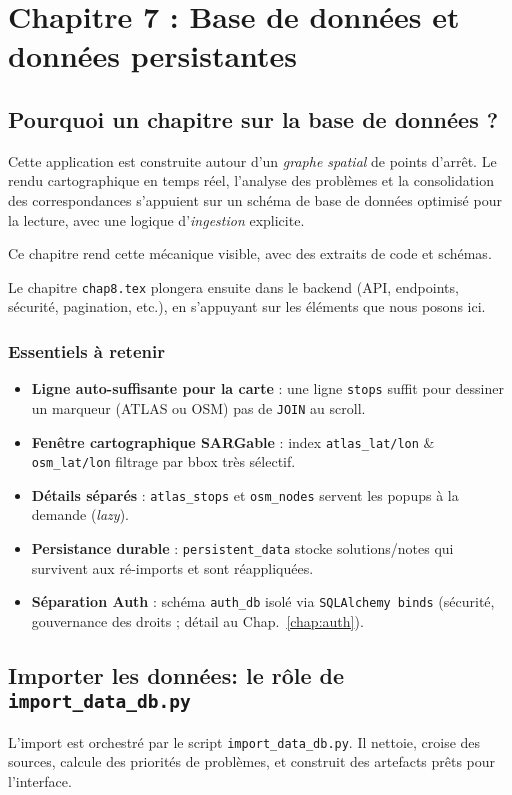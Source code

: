 \chapter{Chapitre 7 : Base de données et données persistantes}

\section*{Pourquoi un chapitre sur la base de données ?}

Cette application est construite autour d'un \textit{graphe spatial} de points d'arrêt. Le rendu cartographique en temps réel, l'analyse des problèmes et la consolidation des correspondances s'appuient sur un schéma de base de données optimisé pour la lecture, avec une logique d'\textit{ingestion} explicite. 

Ce chapitre rend cette mécanique visible, avec des extraits de code et schémas.

\vspace{0.5em}
Le chapitre \texttt{chap8.tex} plongera ensuite dans le backend (API, endpoints, sécurité, pagination, etc.), en s'appuyant sur les éléments que nous posons ici.

\subsection*{Essentiels à retenir}
\begin{itemize}
  \item \textbf{Ligne auto-suffisante pour la carte} : une ligne \texttt{stops} suffit pour dessiner un marqueur (ATLAS ou OSM) \Rightarrow pas de \texttt{JOIN} au scroll.
  \item \textbf{Fenêtre cartographique SARGable} : index \texttt{atlas\_lat/lon} \& \texttt{osm\_lat/lon} \Rightarrow filtrage par bbox très sélectif.
  \item \textbf{Détails séparés} : \texttt{atlas\_stops} et \texttt{osm\_nodes} servent les popups à la demande (\textit{lazy}).
  \item \textbf{Persistance durable} : \texttt{persistent\_data} stocke solutions/notes qui \og survivent \fg{} aux ré-imports et sont réappliquées.
  \item \textbf{Séparation Auth} : schéma \texttt{auth\_db} isolé via \texttt{SQLAlchemy binds} (sécurité, gouvernance des droits ; détail au Chap.~\ref{chap:auth}).
\end{itemize}

\section{Importer les données: le rôle de \texttt{import\_data\_db.py}}
L'import est orchestré par le script \texttt{import\_data\_db.py}. Il nettoie, croise des sources, calcule des priorités de problèmes, et construit des artefacts prêts pour l'interface.

